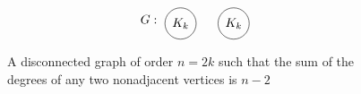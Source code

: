 \begin{figure}[h]
	\centering
	\[G:
	\raisebox{-.5\height}
	{
		\begin{tikzpicture}
			\node[circle,draw] at (0,0){$K_{k}$};
			\node[circle,draw] at (1.5,0){$K_{k}$};
		\end{tikzpicture}
	}\]
	\caption{A disconnected graph of order $n=2k$ such that the sum of the degrees of any two nonadjacent vertices is $n-2$}
\end{figure}